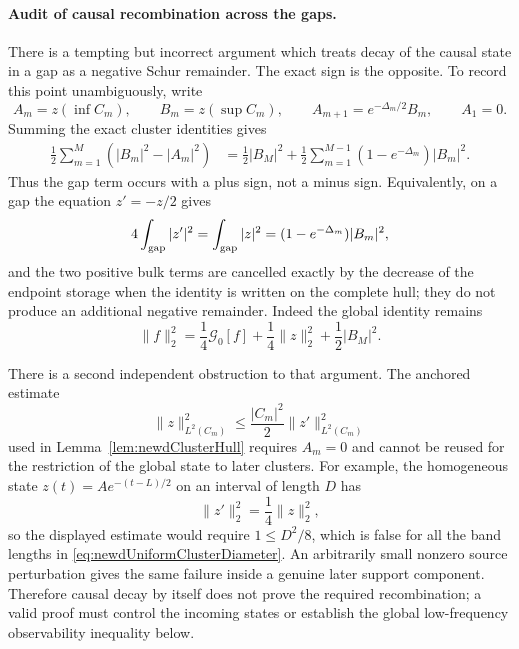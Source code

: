 \documentclass[11pt]{amsart}
\theoremstyle{definition}
\theoremstyle{remark}
\begin{document}
\paragraph{Audit of causal recombination across the gaps.}
There is a tempting but incorrect argument which treats decay of the causal
state in a gap as a negative Schur remainder.  The exact sign is the
opposite.  To record this point unambiguously, write
\[
 A_m=z(\inf C_m),\qquad B_m=z(\sup C_m),\qquad
 A_{m+1}=e^{-\Delta_m/2}B_m,\qquad A_1=0.
\]
Summing the exact cluster identities gives
\begin{align}
 \frac12\sum_{m=1}^M(|B_m|^2-|A_m|^2)
 &=\frac12|B_M|^2
   +\frac12\sum_{m=1}^{M-1}
      (1-e^{-\Delta_m})|B_m|^2.
 \label{eq:newdGapAuditSign}
\end{align}
Thus the gap term occurs with a plus sign, not a minus sign.  Equivalently,
on a gap the equation $z'=-z/2$ gives
\[
 4\int_{\rm gap}|z'|^2
 =\int_{\rm gap}|z|^2
 =(1-e^{-\Delta_m})|B_m|^2,
\]
and the two positive bulk terms are cancelled exactly by the decrease of
the endpoint storage when the identity is written on the complete hull;
they do not produce an additional negative remainder.  Indeed the global
identity remains
\begin{equation}\label{eq:newdGlobalStateAuditIdentity}
 \|f\|_2^2
 =\frac14\mathcal G_0[f]
  +\frac14\|z\|_2^2+\frac12|B_M|^2.
\end{equation}

There is a second independent obstruction to that argument.  The anchored
estimate
\[
 \|z\|_{L^2(C_m)}^2
 \leq\frac{|C_m|^2}{2}\|z'\|_{L^2(C_m)}^2
\]
used in Lemma~\ref{lem:newdClusterHull} requires $A_m=0$ and cannot be
reused for the restriction of the global state to later clusters.  For
example, the homogeneous state $z(t)=Ae^{-(t-L)/2}$ on an interval of
length $D$ has
\[
 \|z'\|_2^2=\frac14\|z\|_2^2,
\]
so the displayed estimate would require $1\leq D^2/8$, which is false for
all the band lengths in \eqref{eq:newdUniformClusterDiameter}.  An
arbitrarily small nonzero source perturbation gives the same failure inside
a genuine later support component.  Therefore causal decay by itself does
not prove the required recombination; a valid proof must control the
incoming states or establish the global low-frequency observability
inequality below.
\end{document}
